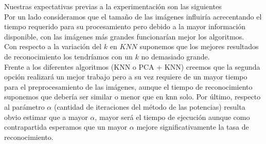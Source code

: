 \par Nuestras expectativas previas a la experimentación son las siguientes\\
Por un lado consideramos que el tamaño de las im\'agenes influiría acrecentando el tiempo requerido para su procesamiento pero debido a la mayor informaci\'on disponible, con las imágenes más grandes 
funcionarían mejor los algoritmos.\\
Con respecto a la variaci\'on del $k$ en $KNN$ suponemos que los mejores resultados de reconocimiento los tendríamos con un $k$ no demasiado grande.\\
Frente a los diferentes algoritmos (KNN o PCA + KNN) creemos que la segunda opci\'on realizar\'a un mejor trabajo pero a su vez requiere de un mayor tiempo para el preprocesamiento de las imágenes, aunque el tiempo de reconocimiento suponemos que debería ser similar o menor que en knn solo.
Por \'ultimo, respecto al par\'ametro $\alpha$ (cantidad de iteraciones del m\'etodo de las potencias) resulta obvio estimar que a mayor $\alpha$, mayor ser\'a el tiempo de ejecución aunque como contrapartida esperamos que un mayor $\alpha$ mejore significativamente la tasa de reconocimiento.

